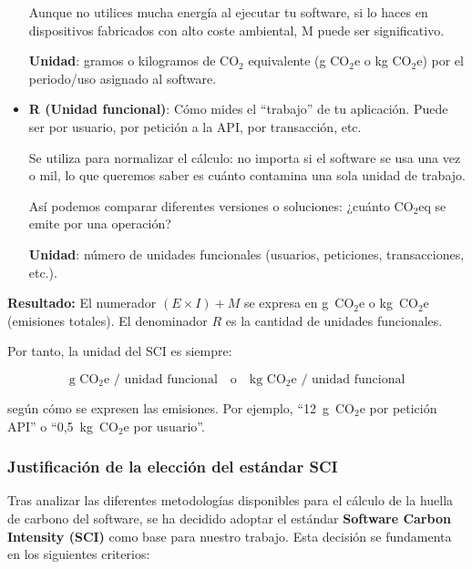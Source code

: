 \documentclass[12pt,a4paper]{report}
\begin{document}
\begin{itemize}
        Aunque no utilices mucha energía al ejecutar tu software, si lo haces en dispositivos fabricados con alto coste ambiental, M puede ser significativo.

        \textbf{Unidad}: gramos o kilogramos de CO$_2$ equivalente (g CO$_2$e o kg CO$_2$e) por el periodo/uso asignado al software.

  \item \textbf{R (Unidad funcional)}: Cómo mides el ``trabajo'' de tu aplicación. Puede ser por usuario, por petición a la API, por transacción, etc.

        Se utiliza para normalizar el cálculo: no importa si el software se usa una vez o mil, lo que queremos saber es cuánto contamina una sola unidad de trabajo.

        Así podemos comparar diferentes versiones o soluciones: ¿cuánto CO$_2$eq se emite por una operación?

        \textbf{Unidad}: número de unidades funcionales (usuarios, peticiones, transacciones, etc.).
\end{itemize}

\textbf{Resultado:} El numerador $(E \times I) + M$ se expresa en g~CO$_2$e o kg~CO$_2$e (emisiones totales). El denominador $R$ es la cantidad de unidades funcionales. 

Por tanto, la unidad del SCI es siempre:

\[
\text{g~CO$_2$e / unidad funcional} 
\quad \text{o} \quad 
\text{kg~CO$_2$e / unidad funcional}
\]

según cómo se expresen las emisiones. Por ejemplo, ``12~g~CO$_2$e por petición API'' o ``0,5~kg~CO$_2$e por usuario''.

\subsubsection{Justificación de la elección del estándar SCI}

Tras analizar las diferentes metodologías disponibles para el cálculo de la huella de carbono del software, se ha decidido adoptar el estándar \textbf{Software Carbon Intensity (SCI)} como base para nuestro trabajo. Esta decisión se fundamenta en los siguientes criterios:
\end{document}
